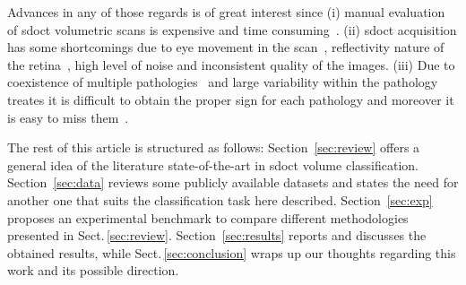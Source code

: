 Advances in any of those regards is of great interest since (i) manual evaluation of \gls{sdoct} volumetric scans is expensive and time consuming~\cite{Venhuizen2015}.
(ii) \gls{sdoct} acquisition has some shortcomings due to eye movement in the scan~\cite{Liu2011}, reflectivity nature of the retina~\cite{schuman2004optical}, high level of noise and inconsistent quality of the images. 
(iii) Due to coexistence of multiple pathologies~\cite{Liu2011} and large variability within the pathology treates it is difficult to obtain the proper sign for each pathology and moreover it is easy to miss them~\cite{Venhuizen2015}.


The rest of this article is structured as follows: Section~\ref{sec:review} offers a general idea of the literature state-of-the-art in \gls{sdoct} volume classification. Section~\ref{sec:data} reviews some publicly available datasets and states the need for another one that suits the classification task here described.
Section~\ref{sec:exp} proposes an experimental benchmark to compare different methodologies presented in Sect.\,\ref{sec:review}.
Section~\ref{sec:results} reports and discusses the obtained results, while Sect.\,\ref{sec:conclusion} wraps up our thoughts regarding this work and its possible direction.


